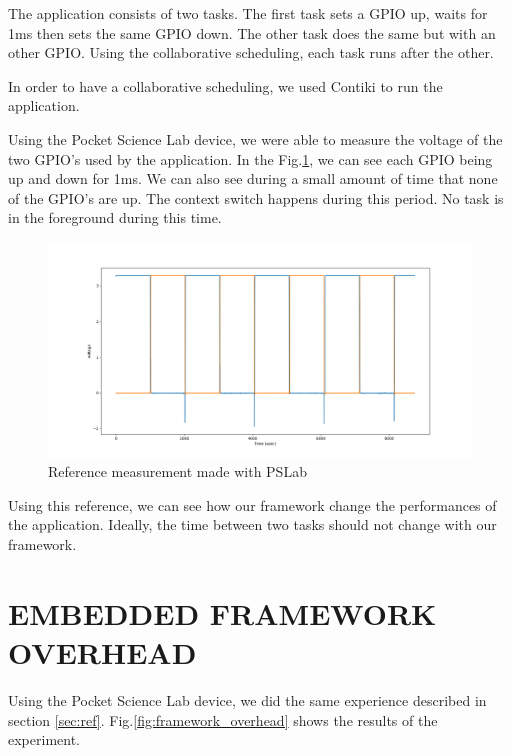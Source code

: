 \documentclass[a4paper, 10pt, conference]{ieeeconf}      %
\begin{document}

The application consists of two tasks.
The first task sets a GPIO up, waits for 1ms then sets the same GPIO down.
The other task does the same but with an other GPIO.
Using the collaborative scheduling, each task runs after the other.

In order to have a collaborative scheduling, we used Contiki to run the application.

Using the Pocket Science Lab device, we were able to measure the voltage of the two GPIO's used by the application.
In the Fig.\ref{fig:ref}, we can see each GPIO being up and down for 1ms.
We can also see during a small amount of time that none of the GPIO's are up.
The context switch happens during this period.
No task is in the foreground during this time.


\begin{figure}[!h]
    \centering
    \includegraphics[scale=0.2]{ref.png}
    \caption{Reference measurement made with PSLab}
    \label{fig:ref}
\end{figure}



Using this reference, we can see how our framework change the performances of the application.
Ideally, the time between two tasks should not change with our framework.

\section{EMBEDDED FRAMEWORK OVERHEAD}

Using the Pocket Science Lab device, we did the same experience described in section \ref{sec:ref}.
Fig.\ref{fig:framework_overhead} shows the results of the experiment.
\end{document}
